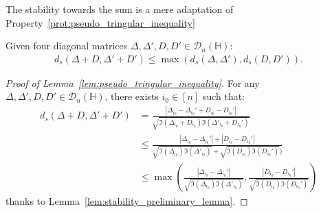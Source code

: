 \documentclass[a4papaer, titlepage]{book}
\begin{document}
The stability towards the sum is a mere adaptation of Property~\ref{prot:pseudo_tringular_inequality}
\begin{lemma}\label{lem:pseudo_tringular_inequality}
  Given four diagonal matrices $\Delta,\Delta',D,D' \in \mathcal D_n(\mathbb H)$:
  \begin{align*}
     d_s(\Delta +D,  \Delta'+D') \leq \max(d_s(\Delta,  \Delta'), d_s(D, D')).
   \end{align*} 
\end{lemma}
\begin{proof}[Proof of Lemma~\ref{lem:pseudo_tringular_inequality}]
  For any $\Delta,\Delta',D,D' \in \mathcal D_n(\mathbb H)$, there exists $i_0 \in [n]$ such that:
  \begin{align*}
  d_s(\Delta+D, \Delta'+D')
    &= \frac{\left\vert \Delta_{i_0}- \Delta_{i_0}'+ D_{i_0}-D_{i_0}' \right\vert}{\sqrt{\Im(\Delta_{i_0}+D_{i_0})\Im(\Delta'_{i_0}+D_{i_0}')}}\\
    &\leq \frac{\left\vert \Delta_{i_0}-\Delta_{i_0}'\right\vert +\left\vert D_{i_0}-D_{i_0}' \right\vert}{\sqrt{\Im(\Delta_{i_0}) \Im(\Delta'_{i_0})} +\sqrt{\Im(D_{i_0})\Im(D_{i_0}' )})}\\
    &\leq \max \left(\frac{\left\vert \Delta_{i_0}-\Delta_{i_0}'\right\vert}{\sqrt{\Im(\Delta_{i_0}) \Im(\Delta'_{i_0})}}, \frac{\left\vert D_{i_0}-D_{i_0}' \right\vert}{\sqrt{\Im(D_{i_0})\Im(D_{i_0}' )}}\right)
  \end{align*}
  thanks to Lemma~\ref{lem:stability_preliminary_lemma}.
\end{proof}
\end{document}

